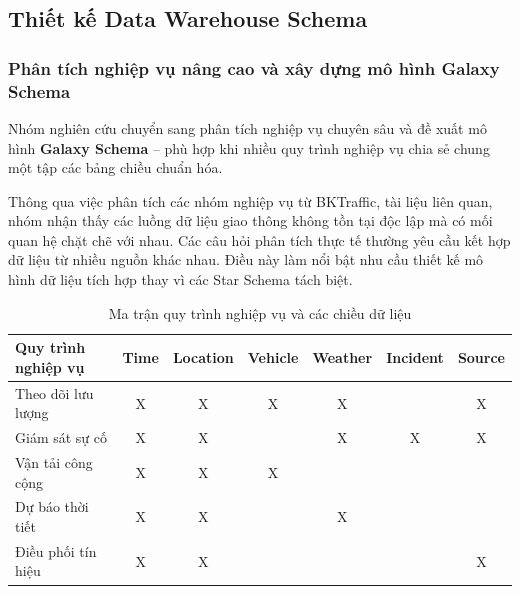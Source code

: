 \subsection{Thiết kế Data Warehouse Schema}
\subsubsection{Phân tích nghiệp vụ nâng cao và xây dựng mô hình Galaxy Schema}

Nhóm nghiên cứu chuyển sang phân tích nghiệp vụ chuyên sâu và đề xuất mô hình \textbf{Galaxy Schema} – phù hợp khi nhiều quy trình nghiệp vụ chia sẻ chung một tập các bảng chiều chuẩn hóa.

Thông qua việc phân tích các nhóm nghiệp vụ từ BKTraffic, tài liệu liên quan, nhóm nhận thấy các luồng dữ liệu giao thông không tồn tại độc lập mà có mối quan hệ chặt chẽ với nhau. Các câu hỏi phân tích thực tế thường yêu cầu kết hợp dữ liệu từ nhiều nguồn khác nhau. Điều này làm nổi bật nhu cầu thiết kế mô hình dữ liệu tích hợp thay vì các Star Schema tách biệt.

\begin{table}[H]
\centering
\caption{Ma trận quy trình nghiệp vụ và các chiều dữ liệu}
\begin{tabular}{|l|c|c|c|c|c|c|}
\hline
\textbf{Quy trình nghiệp vụ} & \textbf{Time} & \textbf{Location} & \textbf{Vehicle} & \textbf{Weather} & \textbf{Incident} & \textbf{Source} \\ \hline
Theo dõi lưu lượng & X & X & X & X & & X \\ \hline
Giám sát sự cố & X & X & & X & X & X \\ \hline
Vận tải công cộng & X & X & X & & & \\ \hline
Dự báo thời tiết & X & X & & X & & \\ \hline
Điều phối tín hiệu & X & X & & & & X \\ \hline
\end{tabular}
\end{table}

